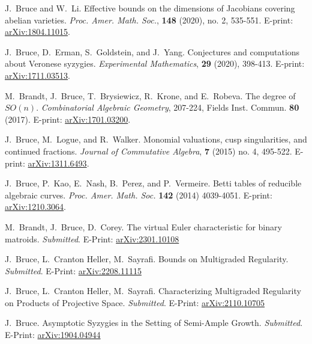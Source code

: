 \documentclass[letterpaper,11pt]{article}
\newcommand{\resheading}[1]{\vspace{8pt}
  \parbox{\textwidth}{\setlength{\FrameSep}{\fboxsep}
    \begin{shaded}
\setlength{\fboxsep}{0pt}\framebox[\textwidth][l]{\setlength{\fboxsep}{4pt}\fcolorbox{shadecolorB}{shadecolorB}{\textbf{\sffamily{\mbox{~}\makebox[6.762in][l]{\large #1} \vphantom{p\^{E}}}}}}
    \end{shaded}
  }\vspace{-5pt}
}
\begin{document}
\begin{revnumerate}[15]
\item
	J.~Bruce and W.~Li. Effective bounds on the dimensions of Jacobians covering abelian varieties.  {\it Proc. Amer. Math. Soc.}, \textbf{148} (2020), no. 2, 535-551. E-print: \hyperref{https://arxiv.org/abs/1804.11015}{}{}{arXiv:1804.11015}.
			
\item
	J.~Bruce, D.~Erman, S.~Goldstein, and J.~Yang. Conjectures and computations about Veronese syzygies.  {\it Experimental Mathematics}, \textbf{29} (2020), 398-413. E-print: \hyperref{https://arxiv.org/abs/1711.03513}{}{}{arXiv:1711.03513}.
	
\item
	M.~Brandt, J.~Bruce, T.~Brysiewicz, R.~Krone, and E.~Robeva. The degree of $SO(n)$. {\it Combinatorial Algebraic Geometry}, 207-224, Fields Inst. Commun. \textbf{80} (2017). E-print: \hyperref{https://arxiv.org/abs/1701.03200}{}{}{arXiv:1701.03200}.
	
\item
	J.~Bruce, M.~Logue, and R.~Walker. Monomial valuations, cusp singularities, and continued fractions. {\it Journal of Commutative Algebra}, \textbf{7} (2015) no. 4, 495-522. E-print: \hyperref{http://arxiv.org/abs/1311.6493}{}{}{arXiv:1311.6493}.

\item
	J.~Bruce, P.~Kao, E.~Nash, B.~Perez, and P.~Vermeire. Betti tables of reducible algebraic curves. {\it Proc. Amer. Math. Soc.} \textbf{142} (2014) 4039-4051. E-print: \hyperref{http://arxiv.org/abs/1210.3064}{}{}{arXiv:1210.3064}.
\end{revnumerate}

\resheading{Pre-Prints}

\begin{revnumerate}

\item
	M.~Brandt, J.~Bruce, D.~Corey. The virtual Euler characteristic for binary matroids. {\it Submitted}. E-Print: \hyperref{https://arxiv.org/abs/2301.10108}{}{}{arXiv:2301.10108}
	
\item
	J.~Bruce, L.~Cranton Heller, M.~Sayrafi. Bounds on Multigraded Regularity.  {\it Submitted}. E-Print: \hyperref{https://arxiv.org/abs/2208.11115}{}{}{arXiv:2208.11115}
	
\item
	J.~Bruce, L.~Cranton Heller, M.~Sayrafi. Characterizing Multigraded Regularity on Products of Projective Space.  {\it Submitted}. E-Print:  \hyperref{https://arxiv.org/abs/2110.10705}{}{}{arXiv:2110.10705}
	
\item
	J.~Bruce. Asymptotic Syzygies in the Setting of Semi-Ample Growth. {\it Submitted}. E-Print:  \hyperref{https://arxiv.org/abs/1904.04944}{}{}{arXiv:1904.04944}

\end{revnumerate}
\end{document}
